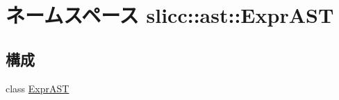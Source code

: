\hypertarget{namespaceslicc_1_1ast_1_1ExprAST}{
\section{ネームスペース slicc::ast::ExprAST}
\label{namespaceslicc_1_1ast_1_1ExprAST}
}
\subsection*{構成}
\begin{DoxyCompactItemize}
\item 
class \hyperlink{classslicc_1_1ast_1_1ExprAST_1_1ExprAST}{ExprAST}
\end{DoxyCompactItemize}

